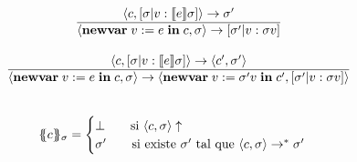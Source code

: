 \begin{multicols}{2}
\[\begin{array}{cll}
          \lang{c, [\sigma | v : \semsAGU{e}]} \rightarrow \sigma' \\
          \overline{\lang{\newvar{v := e}{c}, \sigma} \rightarrow [\sigma' | v : \sigma v]} \\ \\
          \lang{c, [\sigma | v : \semsAGU{e}]} \rightarrow \lang{c', \sigma'} \\
          \overline{\lang{\newvar{v := e}{c}, \sigma} \rightarrow \lang{\newvar{v := \sigma' v}{c'}, [\sigma' | v : \sigma v]}} \\ \\ \\

          \{\!\!\{c\}\!\!\}_{\sigma} = \begin{cases}
            \bot \qquad \text{si } \lang{c, \sigma} \uparrow \\
            \sigma' \qquad \text{si existe } \sigma' \text{ tal que } \lang{c, \sigma} \rightarrow^{\ast} \sigma'
          \end{cases}
        \end{array}\]
      \end{multicols}
      
